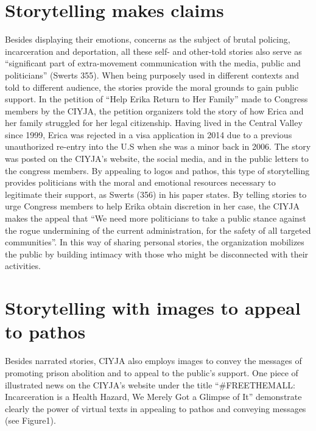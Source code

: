 \documentclass[12pt]{article}
\begin{document}
\begin{flushleft}
\section*{Storytelling makes claims}

Besides displaying their emotions, concerns as the subject of brutal policing, incarceration and deportation, all these self- and other-told stories also serve as ``significant part of extra-movement communication with the media, public and politicians'' (Swerts 355). When being purposely used in different contexts and told to different audience, the stories provide the moral grounds to gain public support. In the petition of ``Help Erika Return to Her Family'' made to Congress members by the CIYJA, the petition organizers told the story of how Erica and her family struggled for her legal citizenship. Having lived in the Central Valley since 1999, Erica was rejected in a visa application in 2014 due to a previous unauthorized re-entry into the U.S when she was a minor back in 2006. The story was posted on the CIYJA's website, the social media, and in the public letters to the congress members. By appealing to logos and pathos, this type of storytelling provides politicians with the moral and emotional resources necessary to legitimate their support, as Swerts (356) in his paper states. By telling stories to urge Congress members to help Erika obtain discretion in her case, the CIYJA makes the appeal that ``We need more politicians to take a public stance against the rogue undermining of the current administration, for the safety of all targeted communities''. In this way of sharing personal stories, the organization mobilizes the public by building intimacy with those who might be disconnected with their activities. 

\section*{Storytelling with images to appeal to pathos}

Besides narrated stories, CIYJA also employs images to convey the messages of promoting prison abolition and to appeal to the public's support. One piece of illustrated news on the CIYJA's website under the title ``\#FREETHEMALL: Incarceration is a Health Hazard, We Merely Got a Glimpse of It'' demonstrate clearly the power of virtual texts in appealing to pathos and conveying messages (see Figure1). 


\end{flushleft}
\end{document}
